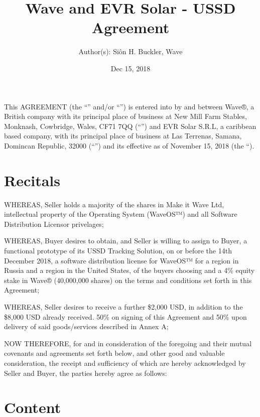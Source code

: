 \documentclass[letterpaper,10pt,english]{sphinxmanual}
\title{Wave and EVR Solar - USSD Agreement}
\date{Dec 15, 2018}
\author{Author(s): Siôn H. Buckler, Wave}
\begin{document}
\maketitle
\sphinxtableofcontents
{}\label{\detokenize{index::doc}}


This AGREEMENT (the “” and/or “”) is entered into by and between Wave®, a British company with its principal place of business at New Mill Farm Stables, Monknash, Cowbridge, Wales, CF71 7QQ (“”)  and EVR Solar S.R.L, a caribbean based company, with its principal place of business at Las Terrenas, Samana, Domincan Republic, 32000  (“”) and its effective as of November 15, 2018 (the “).


\chapter{Recitals}
\label{\detokenize{index:recitals}}
WHEREAS, Seller holds a majority of the shares in Make it Wave Ltd, intellectual property of the Operating System (WaveOS™) and all Software Distribution Licensor privelages;

WHEREAS, Buyer desires to obtain, and Seller is willing to assign to Buyer, a functional prototype of its USSD Tracking Solution, on or before the 14th December 2018, a software distribution license for WaveOS™ for a region in Russia and a region in the United States, of the buyers choosing and a 4\% equity stake in Wave® (40,000,000 shares) on the terms and conditions set forth in this Agreement;

WHEREAS, Seller desires to receive a further \$2,000 USD, in addition to the \$8,000 USD already received. 50\% on signing of this Agreement and 50\% upon delivery of said goods/services described in Annex A;

NOW THEREFORE, for and in consideration of the foregoing and their mutual covenants and agreements set forth below, and other good and valuable consideration, the receipt and sufficiency of which are hereby acknowledged by Seller and Buyer, the parties hereby agree as follows:


\chapter{Content}
\label{\detokenize{index:content}}
\end{document}
